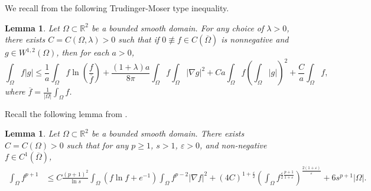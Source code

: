 \documentclass{amsart}
\newtheorem{lemma}[defn]{Lemma}
\numberwithin{equation}{section}
\newcommand{\R}{{ \mathbb{R}  }}
\newcommand{\bke}[1]{\left( #1 \right)}
\begin{document}
We recall from \cite[Lem.~2.2]{Winkler2020} the following Trudinger-Moser type inequality.
\begin{lemma}\label{TMLEM}  
Let $\Omega\subset \mathbb{R}^{2}$ be a bounded smooth domain. For any choice of $\lambda>0$, there exists $C=C(\Omega,\lambda)>0$ such that if $0\not\equiv f\in C(\overline{\Omega})$ is nonnegative and $g\in W^{1,2}(\Omega)$, then for each $a>0$,
\[
\int_{\Omega}f|g|\le \frac{1}{a}\int_{\Omega} f\ln\left(\frac{f}{\overline f}\right)+\frac{(1+\lambda)a}{8\pi}\int_{\Omega}f\int_{\Omega}|\nabla g|^{2}+Ca\int_{\Omega}f\left(\int_{\Omega}|g|\right)^{2}\!\!+\frac{C}{a}\int_{\Omega}f,
\]
where $\overline{f}=\frac{1}{|\Omega|}\int_{\Omega} f$.
\end{lemma}
 Recall  the following lemma from \cite[Lem.2.4]{fujie2016global}.
\begin{lemma}\label{LNIMPR}
Let $\Omega\subset \mathbb{R}^{2}$ be a bounded smooth domain.
 There exists $C=C(\Omega)>0$ such that
for any $p\ge1$, $s>1$, $\varepsilon>0$, and non-negative $f\in C^{1}(\overline{\Omega})$,
\[
\begin{aligned}
\int_{\Omega}f^{p+1}&\le C\frac{(p+1)^{2}}{\ln s}\int_{\Omega} (f\ln f+e^{-1})\int_{\Omega}f^{p-2}|\nabla f|^{2}
+(4C)^{1+\frac{\varepsilon}{2}}\bke{\int_{\Omega}f^{\frac{\varepsilon}{2}\frac{p+1}{1+\varepsilon}}  }^{\frac{2(1+\varepsilon)}{\varepsilon}}+6s^{p+1}|\Omega|.
\end{aligned}
\]
\end{lemma}
\end{document}

